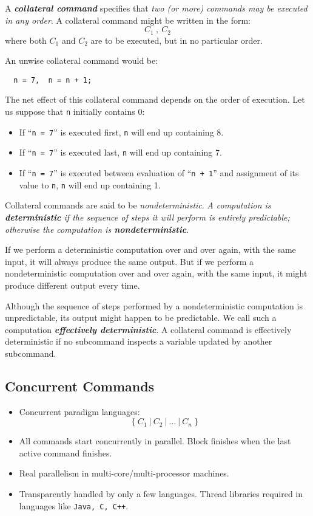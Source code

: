 A \textit{\textbf{collateral command}} specifies that \textit{two (or more) commands may be executed in any order}. A collateral command might be written in the form:
\begin{equation*}
  C_1\ ,\ C_2
\end{equation*}
where both $C_1$ and $C_2$ are to be executed, but in no particular order.

An unwise collateral command would be:
\begin{verbatim}
  n = 7,  n = n + 1;
\end{verbatim}
The net effect of this collateral command depends on the order of execution. Let us suppose that \texttt{n} initially contains 0:
\begin{itemize}
  \item If ``\texttt{n = 7}'' is executed first, \texttt{n} will end up containing 8.
  \item If ``\texttt{n = 7}'' is executed last, \texttt{n} will end up containing 7.
  \item If ``\texttt{n = 7}'' is executed between evaluation of ``\texttt{n + 1}'' and assignment of its value to \texttt{n}, \texttt{n} will end up containing 1.
\end{itemize}

Collateral commands are said to be \textit{nondeterministic}. \textit{A computation is \textbf{deterministic} if the sequence of steps it will perform is entirely predictable; otherwise the computation is \textbf{nondeterministic}}.

If we perform a deterministic computation over and over again, with the same input, it will always produce the same output. But if we perform a nondeterministic computation over and over again, with the same input, it might produce different output every time.

Although the sequence of steps performed by a nondeterministic computation is unpredictable, its output might happen to be predictable. We call such a computation \textit{\textbf{effectively deterministic}}. A collateral command is effectively deterministic if no subcommand inspects a variable updated by another subcommand.

\subsection{Concurrent Commands}
\label{sec:concur-com}

\begin{itemize}
  \item Concurrent paradigm languages:
  \begin{equation*}
    \{\ C_1\ |\ C_2\ |\ \ldots\ |\ C_n\ \}
  \end{equation*}
  \item All commands start concurrently in parallel. Block finishes when the last active command finishes.
  \item Real parallelism in multi-core/multi-processor machines.
  \item Transparently handled by only a few languages. Thread libraries required in languages like \texttt{Java, C, C++}.
\end{itemize}

